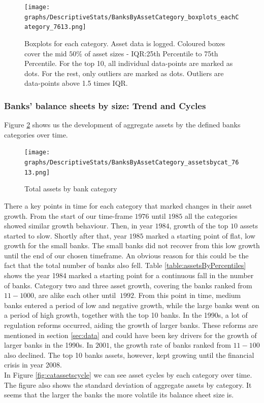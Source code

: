 \documentclass[12pt, a4paper]{article} %
\begin{document}
\begin{figure}[H]
\begin{minipage}{\textwidth}
\texttt{[image: graphs/DescriptiveStats/BanksByAssetCategory\_boxplots\_eachCategory\_7613.png]}
\caption[1]{Boxplots for each category. Asset data is logged. Coloured boxes cover the mid $50\%$ of asset sizes - IQR:25th Percentile to 75th Percentile. For the top 10, all individual data-points are marked as dots. For the rest, only outliers are marked as dots. Outliers are data-points above 1.5 times IQR.}
\label{fig:cat_boxplot}
\end{minipage}
\end{figure}


\subsubsection{Banks' balance sheets by size: Trend and Cycles}
Figure \ref{fig:assetsbycat} shows us the development of aggregate assets by the defined banks categories over time.

\begin{figure}[H]
\begin{minipage}{\textwidth}
\texttt{[image: graphs/DescriptiveStats/BanksByAssetCategory\_assetsbycat\_7613.png]}
\centering
\caption[1]{Total assets by bank category}
\label{fig:assetsbycat}
\end{minipage}
\end{figure}

There a key points in time for each category that marked changes in their asset growth. From the start of our time-frame $1976$ until $1985$ all the categories showed similar growth behaviour. Then, in year $1984$, growth of the top $10$ assets started to slow. Shortly after that, year $1985$ marked a starting point of flat, low growth for the small banks. The small banks did not recover from this low growth until the end of our chosen timeframe. An obvious reason for this could be the fact that the  total number of banks also fell. Table \ref{table:assetsByPercentiles} shows the year 1984 marked a starting point for a continuous fall in the number of banks. Category two and three asset growth, covering the banks ranked from $11-1000$, are alike each other until $~1992$. From this point in time, medium banks entered a period of low and negative growth, while the large banks went on a period of high growth, together with the top 10 banks. In the 1990s, a lot of regulation reforms occurred, aiding the growth of larger banks. These reforms are mentioned in section \ref{sec:data} and could have been key drivers for the growth of larger banks in the 1990s. In $2001$, the growth rate of banks ranked from $11-100$ also declined. The top 10 banks assets, however, kept growing until the financial crisis in year 2008.\\
In Figure \ref{fig:catassetscycle} we can see asset cycles by each category over time. The figure also shows the standard deviation of aggregate assets by category. It seems that the larger the banks the more volatile its balance sheet size is.
\end{document}
